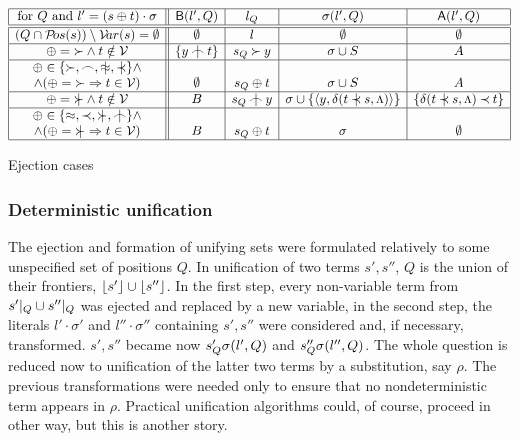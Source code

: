 \begin{table}[hbt]
\begin{center}
\(
\begin{array}{|c||c|c|c|c|}
\hline
   \mbox{for }Q\mbox{ and }l'=(s\oplus t)\cdot \sigma & \Bin(l',Q) & l_Q & \Sub(l',Q) & \At(l',Q) \\
\hline\hline
 (Q\cap\Pos s)\setminus \Var s=\es & \es & l & \es & \es \\ 
\hline
 \oplus=\Cont\land t\notin \Vars & \{y\notInt t\} & s_Q\Cont y & \sigma\cup S & A \\
\hline
 \oplus\in\{\Cont,\Int,\notEq,\notIncl\}\land & & & & \\
 \land (\oplus=\Cont\then t\in \Vars) & \es & s_Q\oplus t & \sigma\cup S & A \\
\hline
 \oplus=\notCont\land t\notin \Vars & B & s_Q\notInt y & \sigma\cup\{\<y,\dt {t\notIncl s}{\Top}\>\} & \{\dt {t\notIncl s}{\Top}\Incl t\} \\
\hline
  \oplus\in\{\Eq,\Incl,\notCont,\notInt\}\land & & & & \\
  \land( \oplus=\notCont\then t\in \Vars) & B & s_Q\oplus t & \sigma & \es \\
\hline
\end{array}
\)
\end{center}
\caption{Ejection cases} \vspace{-3ex} \label{tbl:unification}
\end{table}

\subsubsection{Deterministic unification}

The ejection and formation of unifying sets were formulated relatively to
some unspecified set of positions $Q$.  In unification of two terms $s',s''$,
$Q$ is the union of their frontiers, \(\lfloor s'\rfloor\cup \lfloor s''\rfloor\).  In the first step, every non-variable term from \(s'|_{Q}\cup s''|_{Q}\) was ejected and replaced by a new variable, in the
second step, the literals $l'\cdot\sigma'$ and $l''\cdot\sigma''$ containing
$s',s''$ were considered and, if necessary, transformed.  $s',s''$ became now
\(s'_Q\sigma(l',Q)\) and \(s''_Q\sigma(l'',Q)\).  The whole question is reduced
now to unification of the latter two terms by a substitution, say $\rho$.
The previous transformations were needed only to ensure that no 
nondeterministic term appears in $\rho$.  Practical unification algorithms 
could, of course, proceed in other way, but this is another story.

